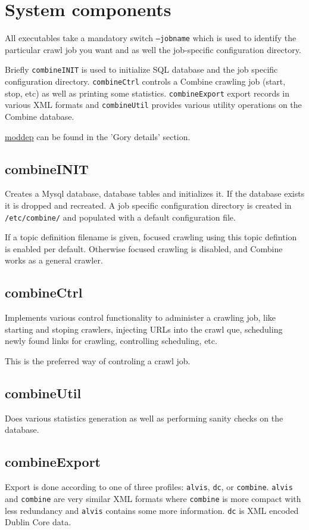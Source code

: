 \section{System components}
\label{comp}
All executables take a mandatory switch {\tt --jobname} which is used
to identify the particular crawl job you want and as well the
job-specific configuration directory.

Briefly {\tt combineINIT} is used to initialize SQL database and the
job specific configuration directory. {\tt combineCtrl} controls a Combine crawling job (start, stop, etc) as well as printing some statistics. {\tt combineExport} export records in various XML formats and 
{\tt combineUtil} provides various utility operations on the Combine database.

\hyperref{Detailed dependency information}{Detailed dependency 
information (section }{)}{moddep} can be found in the 'Gory
details' section.

\subsection{combineINIT}
Creates a Mysql database, database tables and initializes it. If the database exists it is dropped and recreated. A job specific configuration directory is created in {\tt /etc/combine/} and populated with a default configuration file.

If a topic definition filename is given, focused crawling using this topic defintion is enabled per default. Otherwise focused crawling is disabled, and Combine works as a general crawler.

\subsection{combineCtrl}

Implements various control functionality to administer a crawling job, like starting and stoping crawlers, injecting URLs into the crawl que, scheduling newly found links for crawling, controlling scheduling, etc.

This is the preferred way of controling a crawl job.

\subsection{combineUtil}
Does various statistics generation as well as performing sanity checks on the database.

\subsection{combineExport}
Export is done according to one of three profiles: {\tt alvis},
{\tt dc}, or {\tt combine}. {\tt alvis} and {\tt combine} are
very similar XML formats where {\tt combine} is more compact with
less redundancy and
{\tt alvis} contains some more information.
{\tt dc} is XML encoded Dublin Core data.

